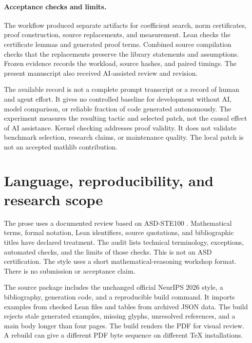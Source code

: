 \paragraph{Acceptance checks and limits.}
The workflow produced separate artifacts for coefficient search, norm certificates, proof construction, source replacements, and measurement.
Lean checks the certificate lemmas and generated proof terms.
Combined source compilation checks that the replacements preserve the library statements and assumptions.
Frozen evidence records the workload, source hashes, and paired timings.
The present manuscript also received AI-assisted review and revision.

The available record is not a complete prompt transcript or a record of human and agent effort.
It gives no controlled baseline for development without AI, model comparison, or reliable fraction of code generated autonomously.
The experiment measures the resulting tactic and selected patch, not the causal effect of AI assistance.
Kernel checking addresses proof validity.
It does not validate benchmark selection, research claims, or maintenance quality.
The local patch is not an accepted mathlib contribution.

\section{Language, reproducibility, and research scope}
The prose uses a documented review based on ASD-STE100 \citep{ste100}.
Mathematical terms, formal notation, Lean identifiers, source quotations, and bibliographic titles have declared treatment.
The audit lists technical terminology, exceptions, automated checks, and the limits of those checks.
This is not an ASD certification.
The style uses a short mathematical-reasoning workshop format.
There is no submission or acceptance claim.

The source package includes the unchanged official NeurIPS 2026 style, a bibliography, generation code, and a reproducible build command.
It imports examples from checked Lean files and tables from archived JSON data.
The build rejects stale generated examples, missing glyphs, unresolved references, and a main body longer than four pages.
The build renders the PDF for visual review.
A rebuild can give a different PDF byte sequence on different TeX installations.
